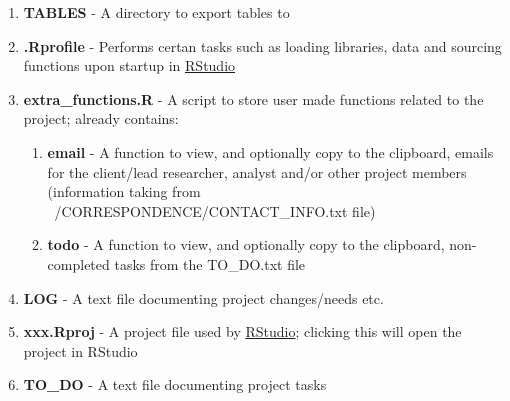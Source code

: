 \documentclass{article}\usepackage[]{graphicx}\usepackage[]{color}
\begin{document}
\begin{enumerate}
  \item \textbf{TABLES} - A directory to export tables to 
  \item \textbf{.Rprofile} - Performs certan tasks such as loading libraries, 
      data and sourcing functions upon startup in \href{http://www.rstudio.com/}{RStudio}
  \item \textbf{extra\_functions.R} - A script to store user made functions related to the project; already contains:
  \begin{enumerate}
     \item \textbf{email} - A function to view, and optionally copy to the clipboard, emails for the client/lead researcher, analyst and/or other project members (information taking from ~/CORRESPONDENCE/CONTACT\_INFO.txt file)
     \item \textbf{todo} - A function to view, and optionally copy to the clipboard, non-completed tasks from the TO\_DO.txt file
  \end{enumerate}   
  \item \textbf{LOG} - A text file documenting project changes/needs etc.
  \item \textbf{xxx.Rproj} - A project file used by \href{http://www.rstudio.com/}{RStudio}; clicking this will open the project in RStudio
  \item \textbf{TO\_DO} - A text file documenting project tasks 
\end{enumerate}
\end{document}

